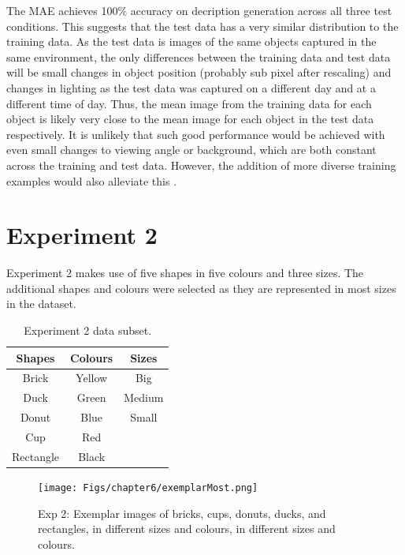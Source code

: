 The MAE achieves 100\% accuracy on decription generation across all three test conditions. This suggests that the test data has a very similar distribution to the training data. As the test data is images of the same objects captured in the same environment, the only differences between the training data and test data will be small changes in object position (probably sub pixel after rescaling) and  changes in lighting as the test data was captured on a different day and at a different time of day. Thus, the mean image from the training data for each object is likely very close to the mean image for each object in the test data respectively. It is unlikely that such good performance would be achieved with even small changes to viewing angle or background, which are both constant across the training and test data. However, the addition of more diverse training examples would also alleviate this \cite{keller2016analysis, keller}.

\section{Experiment 2}

Experiment 2 makes use of five shapes in five colours and three sizes. The additional shapes and colours were selected as they are represented in most sizes in the dataset.

\begin{table}[h]
\centering
\begin{tabular}{|c|c|c|}
\hline

\textbf{Shapes}  & \textbf{Colours} & \textbf{Sizes}\\ \hline \hline
Brick  & Yellow  & Big \\ \hline
Duck   & Green   & Medium \\ \hline
Donut & Blue & Small \\ \hline
Cup  & Red & \\ \hline
Rectangle & Black & \\ \hline

\end{tabular}
\caption{Experiment 2 data subset.}
\label{tab:6_exp2_data} 
\end{table}

\begin{figure}[ht]
    \centering
    \texttt{[image: Figs/chapter6/exemplarMost.png]}
    \caption{Exp 2: Exemplar images of bricks, cups, donuts, ducks, and rectangles, in different sizes and colours, in different sizes and colours.}
    \label{fig:ExmMost}
\end{figure}


